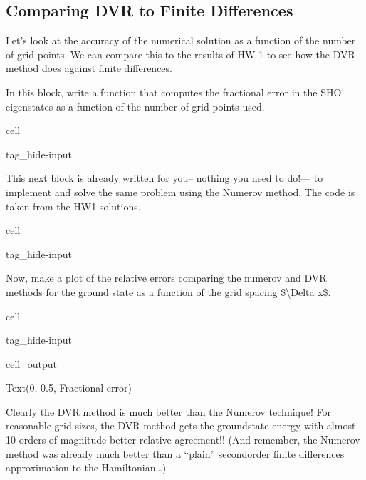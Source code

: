 \documentclass[letterpaper,10pt,english]{jupyterBook}
\begin{document}
\subsection{Comparing DVR to Finite Differences}
\label{\detokenize{Section4_v2:comparing-dvr-to-finite-differences}}
\sphinxAtStartPar
Let’s look at the accuracy of the numerical solution as a function of the number of grid points. We can compare this to the results of HW 1 to see how the DVR method does against finite differences.

\sphinxAtStartPar
In this block, write a function that computes the fractional error in the SHO eigenstates as a function of the number of grid points used.

\begin{sphinxuseclass}{cell}
\begin{sphinxuseclass}{tag_hide-input}
\end{sphinxuseclass}
\end{sphinxuseclass}
\sphinxAtStartPar
This next block is already written for you– nothing you need to do!— to implement and solve the same problem using the Numerov method. The code is taken from the HW1 solutions.

\begin{sphinxuseclass}{cell}
\begin{sphinxuseclass}{tag_hide-input}
\end{sphinxuseclass}
\end{sphinxuseclass}
\sphinxAtStartPar
Now, make a plot of the relative errors comparing the numerov and DVR methods for the ground state as a function of the grid spacing \$\textbackslash{}Delta x\$.

\begin{sphinxuseclass}{cell}
\begin{sphinxuseclass}{tag_hide-input}\begin{sphinxVerbatimOutput}

\begin{sphinxuseclass}{cell_output}
\begin{sphinxVerbatim}[commandchars=\\\{\}]
Text(0, 0.5, \PYGZsq{}Fractional error\PYGZsq{})
\end{sphinxVerbatim}

\noindent{}

\end{sphinxuseclass}\end{sphinxVerbatimOutput}

\end{sphinxuseclass}
\end{sphinxuseclass}
\sphinxAtStartPar
Clearly the DVR method is much better than the Numerov technique! For reasonable grid sizes, the DVR method gets the ground\sphinxhyphen{}state energy with almost 10 orders of magnitude better relative agreement!! (And remember, the Numerov method was already much better than a “plain” second\sphinxhyphen{}order finite differences approximation to the Hamiltonian…)
\end{document}
